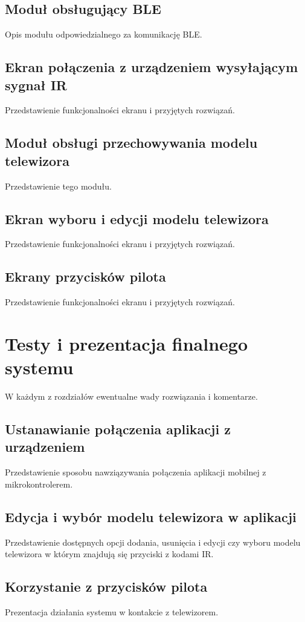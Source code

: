 \documentclass[12pt,twoside]{article}
\begin{document}
\subsection{Moduł obsługujący BLE}
Opis modułu odpowiedzialnego za komunikację BLE.
\subsection{Ekran połączenia z urządzeniem wysyłającym sygnał IR}
Przedstawienie funkcjonalności ekranu i przyjętych rozwiązań.
\subsection{Moduł obsługi przechowywania modelu telewizora}
Przedstawienie tego modułu.
\subsection{Ekran wyboru i edycji modelu telewizora}
Przedstawienie funkcjonalności ekranu i przyjętych rozwiązań.
\subsection{Ekrany przycisków pilota}
Przedstawienie funkcjonalności ekranu i przyjętych rozwiązań.
\clearpage

\section{Testy i prezentacja finalnego systemu}
W każdym z rozdziałów ewentualne wady rozwiązania i komentarze.
\subsection{Ustanawianie połączenia aplikacji z urządzeniem}
Przedstawienie sposobu nawziązywania połączenia aplikacji mobilnej z mikrokontrolerem.
\subsection{Edycja i wybór modelu telewizora w aplikacji}
Przedstawienie dostępnych opcji dodania, usunięcia i edycji czy wyboru modelu telewizora w którym znajdują się przyciski z kodami IR.
\subsection{Korzystanie z przycisków pilota}
Prezentacja działania systemu w kontakcie z telewizorem.
\end{document}
